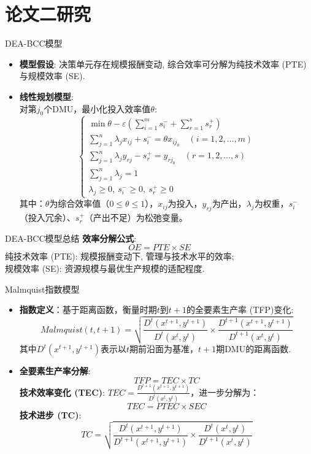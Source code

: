 \documentclass{beamer}
\begin{document}
    \section{论文二研究}
\begin{frame}{DEA-BCC模型}
  \begin{itemize}
    \item \textbf{模型假设}: 决策单元存在规模报酬变动, 综合效率可分解为纯技术效率 (PTE)与规模效率 (SE).
    \item \textbf{线性规划模型}: \\
      对第$j_0$个DMU，最小化投入效率值$\theta$: 
      \[
      \begin{cases} 
      \min \theta - \varepsilon \left( \sum_{i=1}^m s_i^- + \sum_{r=1}^s s_r^+ \right) \\
      \sum_{j=1}^n \lambda_j x_{ij} + s_i^- = \theta x_{ij_0} \quad (i=1,2,\dots,m) \\
      \sum_{j=1}^n \lambda_j y_{rj} - s_r^+ = y_{rj_0} \quad (r=1,2,\dots,s) \\
      \sum_{j=1}^n \lambda_j = 1 \\
      \lambda_j \geq 0, \ s_i^- \geq 0, \ s_r^+ \geq 0 
      \end{cases}
      \]
      其中：$\theta$为综合效率值（$0 \leq \theta \leq 1$），$x_{ij}$为投入，$y_{rj}$为产出，$\lambda_j$为权重，$s_i^-$（投入冗余）、$s_r^+$（产出不足）为松弛变量。
    \end{itemize}
    \end{frame}

\begin{frame}{DEA-BCC模型总结}
\textbf{效率分解公式}: 
      \[
      OE = PTE \times SE
      \]
      纯技术效率 (PTE): 规模报酬变动下, 管理与技术水平的效率; \\
      规模效率 (SE): 资源规模与最优生产规模的适配程度. 
\end{frame}


\begin{frame}{Malmquist指数模型}
  \begin{itemize}
    \item \textbf{指数定义}：基于距离函数，衡量时期$t$到$t+1$的全要素生产率 (TFP)变化: 
      \[
      Malmquist(t,t+1) = \sqrt{\frac{D^t(x^{t+1},y^{t+1})}{D^t(x^t,y^t)} \times \frac{D^{t+1}(x^{t+1},y^{t+1})}{D^{t+1}(x^t,y^t)}}
      \]
      其中$D^t(x^{t+1},y^{t+1})$表示以$t$期前沿面为基准，$t+1$期DMU的距离函数. 
    \item \textbf{全要素生产率分解}: 
      \[
      TFP = TEC \times TC
      \]
    \textbf{技术效率变化 (TEC)}: $TEC = \frac{D^{t+1}(x^{t+1},y^{t+1})}{D^t(x^t,y^t)}$，进一步分解为：
        \[
        TEC = PTEC \times SEC
        \]
    \textbf{技术进步 (TC)}: 
    \[
    TC = \sqrt{\frac{D^t(x^{t+1},y^{t+1})}{D^{t+1}(x^{t+1},y^{t+1})} \times \frac{D^t(x^t,y^t)}{D^{t+1}(x^t,y^t)}}
    \]
  \end{itemize}
  \end{frame}
\end{document}

